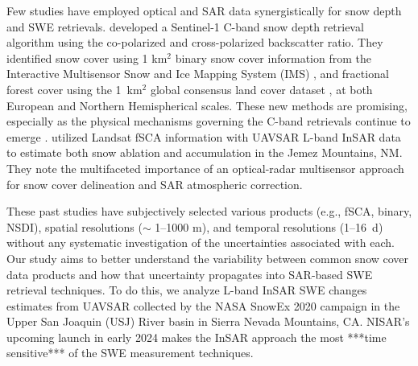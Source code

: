 Few studies have employed optical and SAR data synergistically for snow depth and SWE retrievals. \cite{lievensSnowDepthVariability2019,lievensSentinel1SnowDepth2022} developed a Sentinel-1 C-band snow depth retrieval algorithm using the co-polarized and cross-polarized backscatter ratio. They identified snow cover using 1 km$^{2}$ binary snow cover information from the Interactive Multisensor Snow and Ice Mapping System (IMS) \citep{u.s.nationalicecenterIMSDailyNorthern2008, ramsayInteractiveMultisensorSnow1998, helfrichEnhancementsForthcomingDevelopments2007}, and fractional forest cover using the 1~km$^{2}$ global consensus land cover dataset \citep{tuanmuGlobal1kmConsensus2014}, at both European and Northern Hemispherical scales. These new methods are promising, especially as the physical mechanisms governing the C-band retrievals continue to emerge \citep{zhuModelingScatteringDense2023}. \cite{tarriconeEstimatingSnowAccumulation2023a} utilized Landsat fSCA information with UAVSAR \citep{hensleyUAVSARInstrumentDescription2008} L-band InSAR data to estimate both snow ablation and accumulation in the Jemez Mountains, NM. They note the multifaceted importance of an optical-radar multisensor approach for snow cover delineation and SAR atmospheric correction. 



These past studies have subjectively selected various products (e.g., fSCA, binary, NSDI), spatial resolutions ($\sim$ 1--1000 m), and temporal resolutions (1--16~d) without any systematic investigation of the uncertainties associated with each. Our study aims to better understand the variability between common snow cover data products and how that uncertainty propagates into SAR-based SWE retrieval techniques. To do this, we analyze L-band InSAR SWE changes estimates from UAVSAR collected by the NASA SnowEx 2020 \cite{marshallNASASnowEx20202019} campaign in the Upper San Joaquin (USJ) River basin in Sierra Nevada Mountains, CA. NISAR's upcoming launch in early 2024 makes the InSAR approach the most ***time sensitive*** of the SWE measurement techniques.



